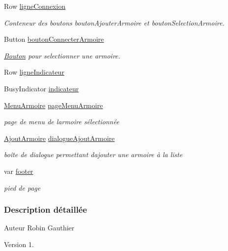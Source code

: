 \begin{DoxyCompactItemize}
Row \hyperlink{class_i_h_m_principale_a187426924da727ece7ad3e7f7fc5889e}{ligne\+Connexion}
\begin{DoxyCompactList}\small\item\em Conteneur des boutons bouton\+Ajouter\+Armoire et bouton\+Selection\+Armoire. \end{DoxyCompactList}\item 
Button \hyperlink{class_i_h_m_principale_aca37af621c4ae808d3281c0db471c4f1}{bouton\+Connecter\+Armoire}
\begin{DoxyCompactList}\small\item\em \hyperlink{class_bouton}{Bouton} pour selectionner une armoire. \end{DoxyCompactList}\item 
Row \hyperlink{class_i_h_m_principale_aa2c067f7708453957775f349941120a5}{ligne\+Indicateur}
\item 
Busy\+Indicator \hyperlink{class_i_h_m_principale_ae27532056def66fff145a6b74d4e4215}{indicateur}
\item 
\hyperlink{class_menu_armoire}{Menu\+Armoire} \hyperlink{class_i_h_m_principale_abb89f99d8df08738f976579701367e84}{page\+Menu\+Armoire}
\begin{DoxyCompactList}\small\item\em page de menu de l\textquotesingle{}armoire sélectionnée \end{DoxyCompactList}\item 
\hyperlink{class_ajout_armoire}{Ajout\+Armoire} \hyperlink{class_i_h_m_principale_aff9d9f225ee85745321820247bc44b4c}{dialogue\+Ajout\+Armoire}
\begin{DoxyCompactList}\small\item\em boîte de dialogue permettant d\textquotesingle{}ajouter une armoire à la liste \end{DoxyCompactList}\item 
var \hyperlink{class_i_h_m_principale_a606fa174839ebad53f5e192c9eec1543}{footer}
\begin{DoxyCompactList}\small\item\em pied de page \end{DoxyCompactList}\end{DoxyCompactItemize}


\subsubsection{Description détaillée}
\begin{DoxyAuthor}{Auteur}
Robin Gauthier
\end{DoxyAuthor}
\begin{DoxyVersion}{Version}
1. 
\end{DoxyVersion}


